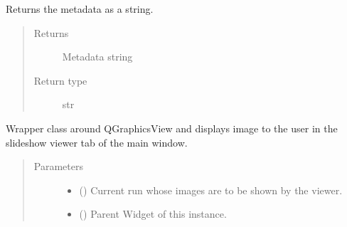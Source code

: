 \documentclass[letterpaper,10pt,english]{sphinxmanual}
\begin{document}
\begin{fulllineitems}
\begin{fulllineitems}
\end{fulllineitems}


\begin{fulllineitems}
\label{\detokenize{polo.widgets:polo.widgets.slideshow_viewer.SlideshowViewer.get_cur_img_meta_str}}
Returns the  metadata as a string.
\begin{quote}\begin{description}
\item[{Returns}] \leavevmode
Metadata string

\item[{Return type}] \leavevmode
str

\end{description}\end{quote}

\end{fulllineitems}


\begin{fulllineitems}
\label{\detokenize{polo.widgets:polo.widgets.slideshow_viewer.SlideshowViewer.photoClicked}}
Wrapper class around QGraphicsView and displays image to the user
in the slideshow viewer tab of the main window.
\begin{quote}\begin{description}
\item[{Parameters}] \leavevmode\begin{itemize}
\item {} 
 ({\hyperref[\detokenize{polo.crystallography:polo.crystallography.run.Run}]{}}) \textendash{} Current run whose images are to be shown by the viewer.

\item {} 
 () \textendash{} Parent Widget of this instance.


\end{itemize}
\end{description}
\end{quote}
\end{fulllineitems}
\end{fulllineitems}
\end{document}
